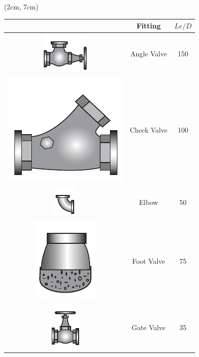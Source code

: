 \documentclass[10pt, oneside]{amsart}
\begin{document}
\begin{textblock*}{.35\textwidth}(2cm, 7cm)
	\centering
	
	\begin{tabular}{ccc}
		\toprule
		                                                                  & Fitting     & $Le/D$ \\
		\midrule
		\includegraphics[scale=0.45]{../../figs/08HWEquivPipe/anglevalve} & Angle Valve & 150    \\
		\midrule
		\includegraphics[scale=0.2]{../../figs/08HWEquivPipe/checkvalve}  & Check Valve & 100    \\
		\midrule
		\includegraphics[scale=0.65]{../../figs/08HWEquivPipe/elbow}      & Elbow       & 50     \\
		\midrule
		\includegraphics[scale=0.2]{../../figs/08HWEquivPipe/footvalve}   & Foot Valve  & 75     \\
		\midrule
		\includegraphics[scale=0.45]{../../figs/08HWEquivPipe/gatevalve}  & Gate Valve  & 35     \\
		\bottomrule
	\end{tabular}
\end{textblock*}
\end{document}
